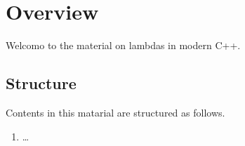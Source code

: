 \chapter*{Overview}

Welcomo to the material on lambdas in modern C++.


\section*{Structure}

Contents in this matarial are structured as follows.

\begin{enumerate}

\item \ldots

\end{enumerate}

